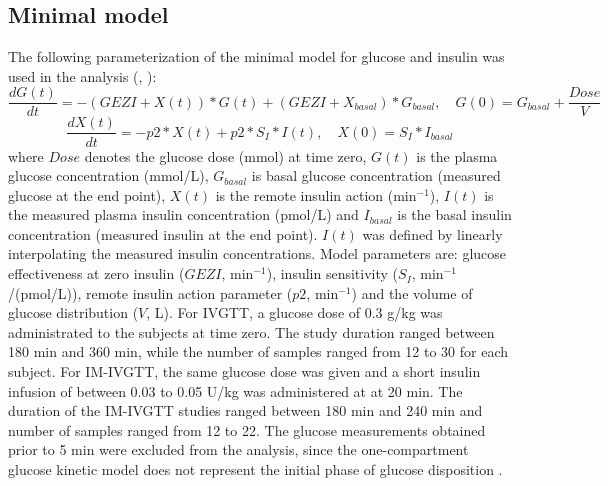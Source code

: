 \documentclass[utf8]{frontiersSCNS} %
\begin{document}
\subsection{Minimal model}
The following parameterization of the minimal model for glucose and insulin was used in the analysis (\citet{Bergman1979}, \citet{Araujo-vilar1998}):
\begin{equation}
\frac{dG(t)}{dt} =-(GEZI+X(t))*G(t)+(GEZI+X_{basal})*G_{basal}, \quad G(0) =G_{basal}+\frac{Dose}{V}\label{eq:01}
\end{equation}
\begin{equation}
\frac{dX(t)}{dt} =-p2*X(t)+p2*S_I*I(t), \quad X(0) =S_I*I_{basal}\label{eq:02}
\end{equation}
where $Dose$ denotes the glucose dose (mmol) at time zero, $G(t)$ is the plasma glucose concentration (mmol/L), $G_{basal}$ is basal glucose concentration (measured glucose at the end point), $X(t)$ is the remote insulin action (min$^{-1}$), $I(t)$ is the measured plasma insulin concentration (pmol/L) and $I_{basal}$ is the basal insulin concentration (measured insulin at the end point). $I(t)$ was defined by linearly interpolating the measured insulin concentrations. Model parameters are: glucose effectiveness at zero insulin ($GEZI$, min$^{-1}$), insulin sensitivity ($S_I$, min$^{-1}$/(pmol/L)), remote insulin action parameter ($p2$, min$^{-1}$) and the volume of glucose distribution ($V$, L). For IVGTT, a glucose dose of 0.3 g/kg was administrated to the subjects at time zero. The study duration ranged between 180 min and 360 min, while the number of samples ranged from 12 to 30 for each subject. For IM-IVGTT, the same glucose dose was given and a short insulin infusion of between 0.03 to 0.05 U/kg  was administered at at 20 min. The duration of the IM-IVGTT studies ranged between 180 min and 240 min and number of samples ranged from 12 to 22. The glucose measurements obtained prior to 5 min were excluded from the analysis, since the one-compartment glucose kinetic model does not represent the initial phase of glucose disposition  \citep{Vicini1999}.

\vskip 0.75cm
\end{document}
